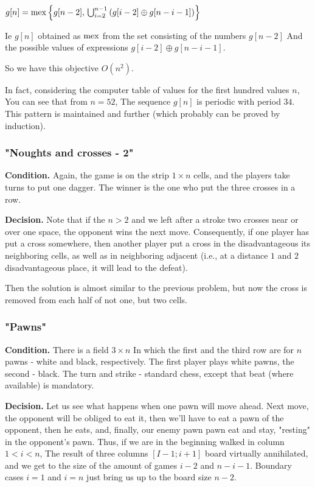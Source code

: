 $g[n]={\rm mex}\left\{ g[n-2],\,\bigcup_{i=2}^{n-1}\left(g[i-2]\oplus g[n-i-1]\right)\right\} $

Ie $g [n]$ obtained as $\rm mex$ from the set consisting of the numbers $g [n-2]$ And the possible values ​​of expressions $g [i-2] \oplus g [n-i-1]$.

So we have this objective $O (n ^ 2)$.

In fact, considering the computer table of values ​​for the first hundred values $n$, You can see that from $n = 52$, The sequence $g [n]$ is periodic with period $34$. This pattern is maintained and further (which probably can be proved by induction).

\subsubsection{ "Noughts and crosses - 2" }

\textbf{Condition.} Again, the game is on the strip $1 \times n$ cells, and the players take turns to put one dagger. The winner is the one who put the three crosses in a row.

\textbf{Decision.} Note that if the $n> 2$ and we left after a stroke two crosses near or over one space, the opponent wins the next move. Consequently, if one player has put a cross somewhere, then another player put a cross in the disadvantageous its neighboring cells, as well as in neighboring adjacent (i.e., at a distance $1$ and $2$ disadvantageous place, it will lead to the defeat).

Then the solution is almost similar to the previous problem, but now the cross is removed from each half of not one, but two cells.

\subsubsection{ "Pawns" }

\textbf{Condition.} There is a field $3 \times n$ In which the first and the third row are for $n$ pawns - white and black, respectively. The first player plays white pawns, the second - black. The turn and strike - standard chess, except that beat (where available) is mandatory.

\textbf{Decision.} Let us see what happens when one pawn will move ahead. Next move, the opponent will be obliged to eat it, then we'll have to eat a pawn of the opponent, then he eats, and, finally, our enemy pawn pawn eat and stay, "resting" in the opponent's pawn. Thus, if we are in the beginning walked in column $1 <i <n$, The result of three columns $[I-1; i +1]$ board virtually annihilated, and we get to the size of the amount of games $i-2$ and $n - i - 1$. Boundary cases $i = 1$ and $i = n$ just bring us up to the board size $n-2$.

